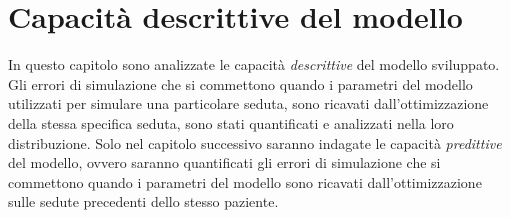 \chapter{Capacità descrittive del modello}\label{ch:descrizione}
In questo capitolo sono analizzate le capacità \textit{descrittive} del modello sviluppato. Gli errori di simulazione che si commettono quando i parametri del modello utilizzati per simulare una particolare seduta, sono ricavati dall'ottimizzazione della stessa specifica seduta, sono stati quantificati e analizzati nella loro distribuzione. Solo nel capitolo successivo saranno indagate le capacità \textit{predittive} del modello, ovvero saranno quantificati gli errori di simulazione che si commettono quando i parametri del modello sono ricavati dall'ottimizzazione sulle sedute precedenti dello stesso paziente.

